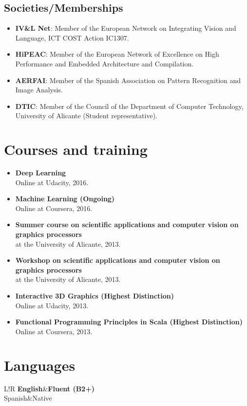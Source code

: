 \documentclass[8pt]{article}
\newcommand\VRule{\color{lightgray}\vrule width 0.5pt}
\begin{document}
\subsection*{Societies/Memberships}

\begin{itemize}
	\item \textbf{IV\&L Net}: Member of the European Network on Integrating Vision and Language, ICT COST Action IC1307.
	\item \textbf{HiPEAC}: Member of the European Network of Excellence on High Performance and Embedded Architecture and Compilation.
	\item \textbf{AERFAI}: Member of the Spanish Association on Pattern Recognition and Image Analysis.
	\item \textbf{DTIC}: Member of the Council of the Department of Computer Technology, University of Alicante (Student representative).
\end{itemize}


\section*{Courses and training}

\begin{itemize}
	\item \textbf{Deep Learning}\\ Online at Udacity, 2016.
	\item \textbf{Machine Learning (Ongoing)}\\ Online at Coursera, 2016.
	\item \textbf{Summer course on scientific applications and computer vision on graphics processors}\\ at the University of Alicante, 2013.
	\item \textbf{Workshop on scientific applications and computer vision on graphics processors}\\ at the University of Alicante, 2013.	
	\item \textbf{Interactive 3D Graphics (Highest Distinction)}\\
	Online at Udacity, 2013.
	\item \textbf{Functional Programming Principles in Scala (Highest Distinction)}\\
	Online at Coursera, 2013.
\end{itemize}

\section*{Languages}
\begin{tabular}{L!{\VRule}R}
{\bf English}&{\bf Fluent (B2+)}\\
{Spanish}&{Native}\\
\end{tabular}
\end{document}
